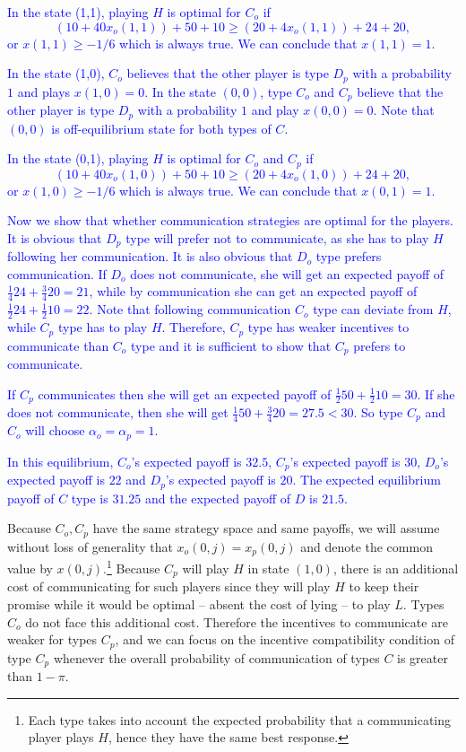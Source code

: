 \documentclass[12pt]{article}
\theoremstyle{break}
\begin{document}
\textcolor{blue}{In the state (1,1), playing $H$ is optimal for $C_o$ if $$ (10+40x_o(1,1))+50+10\geq (20+4x_o(1,1))+24+20,$$ or $x(1,1)\geq-1/6$ which is always true. We can conclude that $x(1,1)=1$.}

\textcolor{blue}{In the state (1,0), $C_o$ believes that the other player is type $D_p$ with a probability $1$ and plays $x(1,0)=0$. In the state $(0,0)$, type $C_o$ and $C_p$ believe that the other player is type $D_p$ with a probability $1$ and play $x(0,0)=0$. Note that $(0,0)$ is off-equilibrium state for both types of $C$.}

\textcolor{blue}{In the state (0,1), playing $H$ is optimal for $C_o$ and $C_p$ if $$ (10+40x_o(1,0))+50+10\geq (20+4x_o(1,0))+24+20,$$ or $x(1,0)\geq-1/6$ which is always true. We can conclude that $x(0,1)=1$.}

\textcolor{blue}{Now we show that whether communication strategies are optimal for the players. It is obvious that $D_p$ type will prefer not to communicate, as she has to play $H$ following her communication. It is also obvious that $D_o$ type prefers communication. If $D_o$ does not communicate, she will get an expected payoff of $\frac{1}{4}24+\frac{3}{4}20=21$, while by communication she can get an expected payoff of $\frac{1}{2}24+\frac{1}{2}10=22$. Note that following communication $C_o$ type can deviate from $H$, while $C_p$ type has to play $H$. Therefore, $C_p$ type has weaker incentives to communicate than $C_o$ type and it is sufficient to show that $C_p$ prefers to communicate.}

\textcolor{blue}{If $C_p$ communicates then she will get an expected payoff of $\frac{1}{2}50+\frac{1}{2}10=30$. If she does not communicate, then she will get $\frac{1}{4}50+\frac{3}{4}20=27.5<30$. So type $C_p$ and $C_o$ will choose $\alpha_o=\alpha_p=1$.}

\textcolor{blue}{In this equilibrium, $C_o$'s expected payoff is $32.5$, $C_p$'s expected payoff is $30$, $D_o$'s expected payoff is $22$ and $D_p$'s expected payoff is $20$. The expected equilibrium payoff of $C$ type is $31.25$ and the expected payoff of $D$ is $21.5$.}

Because $C_o,C_p$ have the same strategy space and same payoffs, we will assume without loss of generality that $x_o(0,j)=x_p(0,j)$ and denote the common value by $x(0,j)$.\footnote{%
Each type takes into account the expected probability that a communicating player plays $H$, hence they have the same best response.
} Because $C_p$ will play $H$ in state $(1,0)$, there is an additional cost of communicating for such players since they will play $H$ to keep their promise while it would be optimal -- absent the cost of lying -- to play $L$. Types $C_o$ do not face this additional cost. Therefore the incentives to communicate are weaker for types $C_p$, and we can focus on the incentive compatibility condition of type $C_p$ whenever the overall probability of communication of types $C$ is greater than $1-\pi$.
\end{document}
